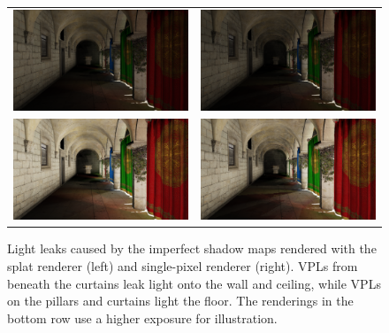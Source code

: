 \begin{figure}[]
\centering
  \begin{tabular}{@{}cc@{}}
    \includegraphics[width=.48\textwidth]{screenshots/leaks_splat} &
    \includegraphics[width=.48\textwidth]{screenshots/leaks_single_pixel}\\
    \includegraphics[width=.48\textwidth]{screenshots/leaks_splat_exposure} &
    \includegraphics[width=.48\textwidth]{screenshots/leaks_single_pixel_exposure}
  \end{tabular}
  \caption{Light leaks caused by the imperfect shadow maps rendered with the splat renderer (left) and single-pixel renderer (right). VPLs from beneath the curtains leak light onto the wall and ceiling, while VPLs on the pillars and curtains light the floor. The renderings in the bottom row use a higher exposure for illustration. }
  \label{fig:results:leaks}
\end{figure}


